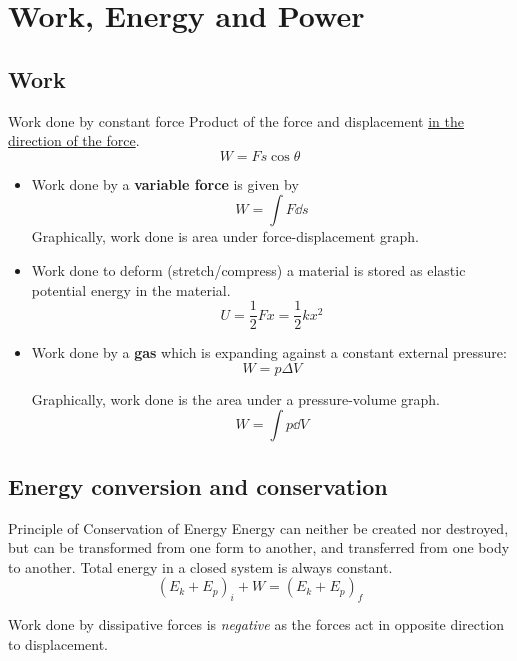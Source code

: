 \section{Work, Energy and Power}
\subsection{Work}
\begin{defn}{Work done by constant force}{}
Product of the force and displacement \underline{in the direction of the force}.
\begin{equation} W = F s \cos \theta \end{equation}
\end{defn} 

\begin{itemize}
\item Work done by a \textbf{variable force} is given by
\begin{equation} W = \int F \dd{s} \end{equation}
Graphically, work done is area under force-displacement graph.

\item Work done to deform (stretch/compress) a material is stored as elastic potential energy in the material.
\begin{equation}
    U = \frac{1}{2}Fx = \frac{1}{2}kx^2
\end{equation}

\item Work done by a \textbf{gas} which is expanding against a constant external pressure: 
\begin{equation}
W = p \Delta V
\end{equation}

Graphically, work done is the area under a pressure-volume graph.
\[ W = \int p \dd{V} \]
\end{itemize}
\pagebreak

\subsection{Energy conversion and conservation}
\begin{defn}{Principle of Conservation of Energy}{}
Energy can neither be created nor destroyed, but can be transformed from one form to another, and transferred from one body to another. Total energy in a closed system is always constant.
 \begin{equation}
(E_k+E_p)_i + W = (E_k+E_p)_f
\end{equation}
\begin{remark}
Work done by dissipative forces is \emph{negative} as the forces act in opposite direction to displacement.
\end{remark}
\end{defn}

